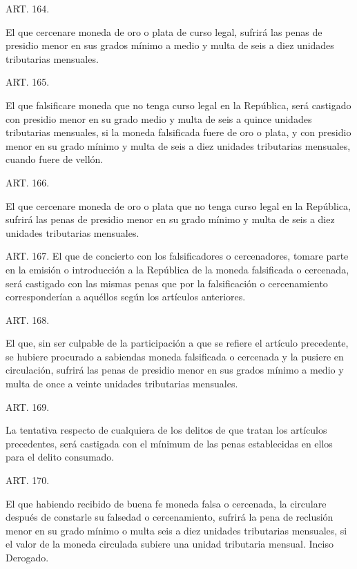     ART. 164.

    El que cercenare moneda de oro o plata de curso legal, sufrirá las penas de presidio menor en sus grados mínimo a medio y multa de seis a diez unidades tributarias mensuales.








    ART. 165.

    El que falsificare moneda que no tenga curso legal en la República, será castigado con presidio menor en su grado medio y multa de seis a quince unidades tributarias mensuales, si la moneda falsificada fuere de oro o plata, y con presidio menor en su grado mínimo y multa de seis a diez unidades tributarias mensuales, cuando fuere de vellón.




    ART. 166.

    El que cercenare moneda de oro o plata que no tenga curso legal en la República, sufrirá las penas de presidio menor en su grado mínimo y multa de seis a diez unidades tributarias mensuales.








    ART. 167.
    El que de concierto con los falsificadores o cercenadores, tomare parte en la emisión o introducción a la República de la moneda falsificada o cercenada, será castigado con las mismas penas que por la falsificación o cercenamiento corresponderían a aquéllos según los artículos anteriores.


    ART. 168.

    El que, sin ser culpable de la participación a que se refiere el artículo precedente, se hubiere procurado a sabiendas moneda falsificada o cercenada y la pusiere en circulación, sufrirá las penas de presidio menor en sus grados mínimo a medio y multa de once a veinte unidades tributarias mensuales.








    ART. 169.

    La tentativa respecto de cualquiera de los delitos de que tratan los artículos precedentes, será castigada con el mínimum de las penas establecidas en ellos para el delito consumado.


    ART. 170.

    El que habiendo recibido de buena fe moneda falsa o cercenada, la circulare después de constarle su falsedad o cercenamiento, sufrirá la pena de reclusión menor en su grado mínimo o multa seis a diez unidades tributarias mensuales, si el valor de la moneda circulada subiere una unidad tributaria mensual.
    Inciso Derogado.





